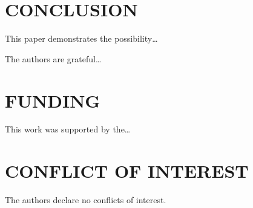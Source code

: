 \documentclass[
 aps, pra,
 amsmath,amssymb,
 11pt,
 final,
tightenlines,
 twoside,
 twocolumn,
 nofloats,
nofootinbib,
 superscriptaddress,
showkeys,
showkeywords,
 ]
{revtex4-2}
\begin{document}
\section{CONCLUSION}

This paper demonstrates the possibility\ldots


\begin{acknowledgments}
The authors are grateful\ldots
\end{acknowledgments}

\section*{FUNDING}
This work was supported by the\ldots

\section*{CONFLICT OF INTEREST}
The authors declare no conflicts of interest.




\end{document}
